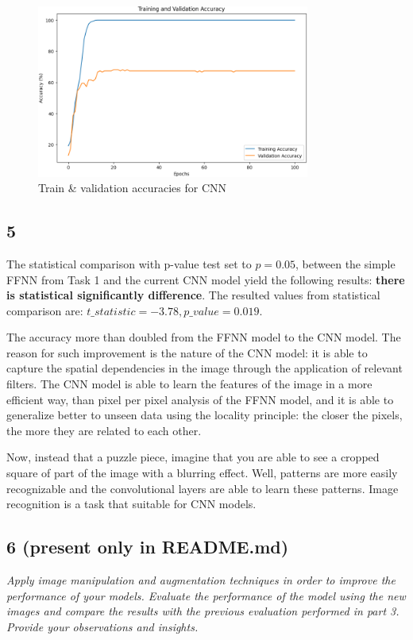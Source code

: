 \documentclass[11pt]{scrartcl}
\begin{document}
\begin{figure}[htbp]
\centering
\includegraphics[width=0.8\textwidth]{./figures/task2-accuracy.png}
\caption{Train \& validation accuracies for CNN}
\label{fig:task2-accuracy}
\end{figure}


\subsection*{5}

The statistical comparison with p-value test set to 
\( p = 0.05 \),
between the simple FFNN from Task 1 and the current CNN model yield 
the following results:
\textbf{there is statistical significantly difference}.
The resulted values from statistical comparison are:
\( t\_statistic = -3.78, p\_value = 0.019 \).

The accuracy more than doubled from the FFNN model to the CNN model.
The reason for such improvement is the nature of the CNN model:
it is able to capture the spatial dependencies in the image through the application of relevant filters.
The CNN model is able to learn the features of the image in a more efficient way,
than pixel per pixel analysis of the FFNN model,
and it is able to generalize better to unseen data
using the locality principle:
the closer the pixels, the more they are related to each other.

Now, instead that a puzzle piece, 
imagine that you are able to see a cropped square 
of part of the image with a blurring effect.
Well, patterns are more easily recognizable
and the convolutional layers are able to learn these patterns.
Image recognition is a task that suitable for CNN models.

\subsection*{6 (present only in README.md)}
\textit{
Apply image manipulation and augmentation techniques in order to improve the performance of your models. 
Evaluate the performance of the model using the new images 
and compare the results with the previous evaluation performed in part 3. 
Provide your observations and insights.
}
\newline
\end{document}
